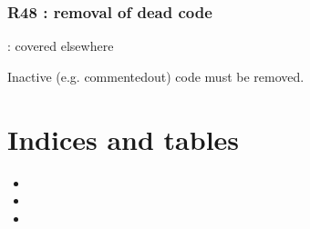\documentclass[letterpaper,10pt,english]{sphinxmanual}
\begin{document}
\subsection{R48 :  removal of dead code}
\label{\detokenize{obsolescent/r48:r48-removal-of-dead-code}}\label{\detokenize{obsolescent/r48::doc}}
\sphinxAtStartPar
{} : covered elsewhere

\sphinxAtStartPar
Inactive (e.g. commented\sphinxhyphen{}out) code must be removed.


\chapter{Indices and tables}
\label{\detokenize{index:indices-and-tables}}\begin{itemize}
\item {} 
\sphinxAtStartPar
{}

\item {} 
\sphinxAtStartPar
{}

\item {} 
\sphinxAtStartPar
{}

\end{itemize}



\renewcommand{\indexname}{Index}
\printindex
\end{document}
